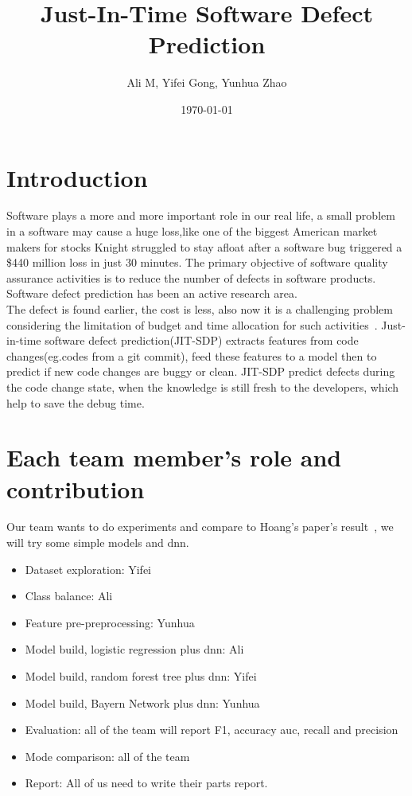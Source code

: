 \documentclass{article}
\title{Just-In-Time Software Defect Prediction}
\author{Ali M, Yifei Gong, Yunhua Zhao}
\date{\today}
\begin{document}
\maketitle

\section{Introduction}
Software plays a more and more important role in our real life, a small problem in a software may cause a huge loss,like one of the biggest American market makers for stocks Knight struggled to stay afloat after a software bug triggered a \$440 million loss in just 30 minutes. The primary objective of software quality assurance activities is to reduce the number of defects in software products. Software defect prediction has been an active research area. \\
The defect is found earlier, the cost is less, also now it is a challenging problem considering the limitation of budget and time allocation for such activities~\cite{wan2018perceptions}. Just-in-time software defect prediction(JIT-SDP) extracts features from code changes(eg.codes from a git commit), feed these features to a model then to predict if new code changes are buggy or clean. JIT-SDP predict defects during the code change state, when the knowledge is still fresh to the developers, which help to save the debug time.

\section{Each team member’s role and contribution}
Our team wants to do experiments and compare to Hoang's paper's result~\cite{hoang2019deepjit}, we will try some simple models and dnn.\\
\begin{itemize}
	\item Dataset exploration: Yifei 
	\item Class balance: Ali
	\item Feature pre-preprocessing: Yunhua
	\item Model build, logistic regression plus dnn: Ali
	\item Model build, random forest tree plus dnn: Yifei
	\item Model build, Bayern Network plus dnn: Yunhua
	\item Evaluation: all of the team will report F1, accuracy auc, recall and precision
	\item Mode comparison: all of the team
	\item Report: All of us need to write their parts report.
\end{itemize}
\end{document}

